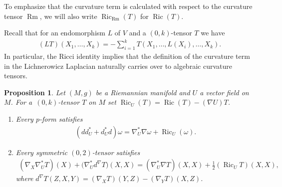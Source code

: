 \documentclass[pdftex]{sigma}
\numberwithin{equation}{section}
\newtheorem{Proposition}[Theorem]{Proposition}
{ \theoremstyle{definition}
\newtheorem{Remark}[Theorem]{Remark} }
\newcommand{\Ric} {\operatorname{Ric}}
\newcommand{\Rm} {\operatorname{Rm}}
\begin{document}
To emphasize that the curvature term is calculated with respect to the curvature tensor $\Rm$, we will also write $\Ric_{\Rm}(T)$ for $\Ric(T)$.

Recall that for an endomorphism $L$ of $V$ and a $(0,k)$-tensor $T$ we have
\begin{gather*}
(LT)(X_1, \dots, X_k) = - \sum_{i=1}^k T(X_1, \dots,L(X_i), \dots, X_k).
\end{gather*}
In particular, the Ricci identity implies that the definition of the curvature term in the Lichnerowicz Laplacian naturally carries over to algebraic curvature tensors.

\begin{Proposition}\label{BochnerFormulasExample}
Let $(M,g)$ be a Riemannian manifold and $U$ a vector field on~$M$. For a~$(0,k)$-tensor $T$ on $M$ set $\Ric_U(T)=\Ric(T) - (\nabla U)T$.
\begin{enumerate}\itemsep=0pt
\item[$(a)$] Every $p$-form satisfies
\begin{gather*}
( d d^{*}_U + d^{*}_U d ) \omega = \nabla^{*}_U \nabla \omega + \Ric_U(\omega).
\end{gather*}
\item[$(b)$] Every symmetric $(0,2)$-tensor satisfies
\begin{gather*}
 ( \nabla_X \nabla^{*}_U T  )(X) + \big( \nabla^{*}_U d^{\nabla} T \big) (X,X) =  ( \nabla^{*}_U \nabla T  )(X,X)+ \frac{1}{2}  ( \Ric_U T  ) (X,X),
\end{gather*}
where $d^{\nabla}T(Z,X,Y)=  (\nabla_X T  )(Y,Z) - (\nabla_Y T )(X,Z)$.
\end{enumerate}
\end{Proposition}
\end{document}
